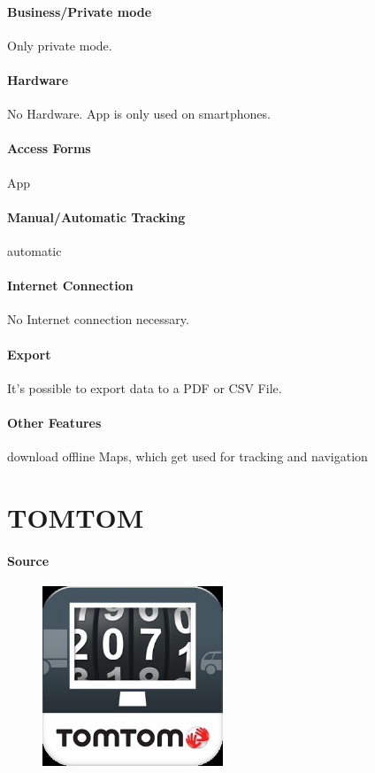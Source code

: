 \paragraph{Business/Private mode} Only private mode.
\paragraph{Hardware} No Hardware. App is only used on smartphones.
\paragraph{Access Forms} App
\paragraph{Manual/Automatic Tracking} automatic
\paragraph{Internet Connection} No Internet connection necessary.
\paragraph{Export} It’s possible to export data to a PDF or CSV File.
\paragraph{Other Features} download offline Maps, which get used for tracking and navigation
\newpage

\section{TOMTOM}
\paragraph{Source} 
\begin{figure}
  \begin{center}
    \includegraphics[width=0.48\textwidth]{tomtom}
  \end{center}
\end{figure}
